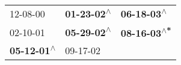 \begin{supertabular}{lll}
                  12-08-00\textsuperscript{} &  \textbf{01-23-02\textsuperscript{$\wedge$}} &   \textbf{06-18-03\textsuperscript{$\wedge$}} \\
                  02-10-01\textsuperscript{} &  \textbf{05-29-02\textsuperscript{$\wedge$}} &  \textbf{08-16-03\textsuperscript{$\wedge$*}} \\
 \textbf{05-12-01\textsuperscript{$\wedge$}} &                   09-17-02\textsuperscript{} &                                               \\
\end{supertabular}

